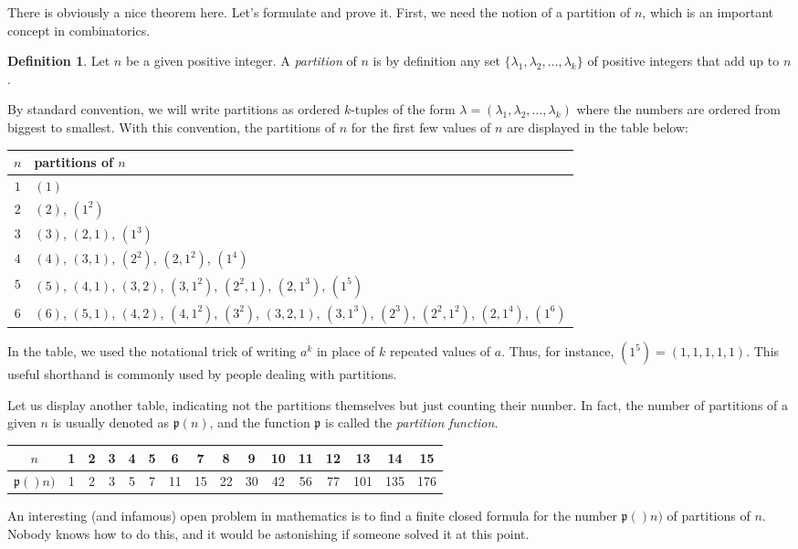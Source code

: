 \documentclass[11pt,oneside]{article}
\theoremstyle{definition}
\newtheorem{defn}[thm]{Definition}
\newcommand{\ptn}{\mathfrak{p}}
\begin{document}
There is obviously a nice theorem here. Let's formulate and prove it.
First, we need the notion of a partition of $n$, which is an important
concept in combinatorics.

\begin{defn}
  Let $n$ be a given positive integer. A \emph{partition} of $n$ is by
  definition any set $\{\lambda_1, \lambda_2, \dots, \lambda_k\}$ of
  positive integers that add up to $n$. 
\end{defn}

By standard convention, we will write partitions as ordered $k$-tuples
of the form $\lambda = (\lambda_1, \lambda_2, \dots, \lambda_k)$ where
the numbers are ordered from biggest to smallest. With this
convention, the partitions of $n$ for the first few values of $n$ are
displayed in the table below:
\begin{center}\small
\begin{tabular}{|c|l|}\hline
  $n$ & partitions of $n$ \\ \hline
  $1$ & $(1)$\\
  $2$ & $(2)$, $(1^2)$\\
  $3$ & $(3)$, $(2,1)$, $(1^3)$\\
  $4$ & $(4)$, $(3,1)$, $(2^2)$, $(2,1^2)$, $(1^4)$\\
  $5$ & $(5)$, $(4,1)$, $(3,2)$, $(3,1^2)$, $(2^2,1)$, $(2,1^3)$,
        $(1^5)$\\ 
  $6$ & $(6)$, $(5,1)$, $(4,2)$, $(4,1^2)$, $(3^2)$, $(3,2,1)$, 
        $(3,1^3)$, $(2^3)$, $(2^2, 1^2)$, $(2,1^4)$, $(1^6)$\\
\hline
\end{tabular}
\end{center}
In the table, we used the notational trick of writing $a^k$ in place
of $k$ repeated values of $a$. Thus, for instance, $(1^5) =
(1,1,1,1,1)$. This useful shorthand is commonly used by people dealing
with partitions.

Let us display another table, indicating not the partitions
themselves but just counting their number. In fact, the number of
partitions of a given $n$ is usually denoted as $\ptn(n)$, and the
function $\ptn$ is called the \emph{partition function}. 
\begin{center}\small
\begin{tabular}{|c|c|c|c|c|c|c|c|c|c|c|c|c|c|c|c|}\hline
  $n$ & 1&2&3&4&5&6&7&8&9&10&11&12&13&14&15\\ \hline
  $\ptn()n)$ &1&2&3&5&7&11&15&22&30&42&56&77&101&135&176\\
  \hline
\end{tabular}
\end{center}
An interesting (and infamous) open problem in mathematics is to find a
finite closed formula for the number $\ptn()n)$ of partitions of
$n$. Nobody knows how to do this, and it would be astonishing if
someone solved it at this point.
\end{document}
